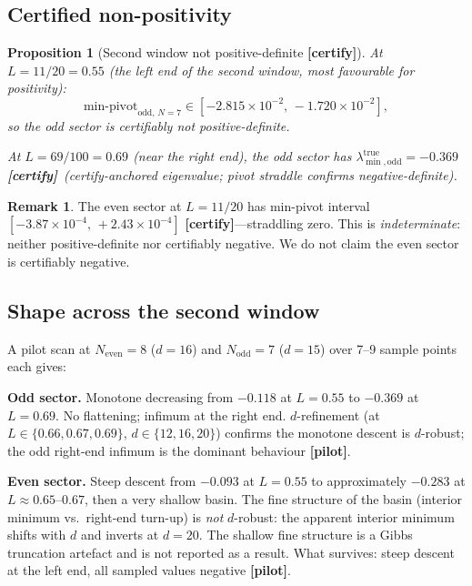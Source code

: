 \documentclass[12pt,a4paper]{amsart}
\theoremstyle{plain}
\newtheorem{proposition}[theorem]{Proposition}
\theoremstyle{definition}
\newtheorem{remark}[theorem]{Remark}
\newcommand{\ltrues}[1]{\lambda_{\min,\mathrm{#1}}^{\mathrm{true}}}
\newcommand{\certify}{\textbf{[certify]}}
\newcommand{\pilot}{\textbf{[pilot]}}
\begin{document}
\subsection{Certified non-positivity}

\begin{proposition}[Second window not positive-definite \certify]
\label{prop:second-negative}
At $L = 11/20 = 0.55$ (the left end of the second window, most favourable
for positivity):
\[
  \text{min-pivot}_{\mathrm{odd},\,N=7} \in [-2.815\times10^{-2},\,-1.720\times10^{-2}],
\]
so the odd sector is certifiably not positive-definite.

At $L = 69/100 = 0.69$ (near the right end), the odd sector has
$\ltrues{odd} = -0.369$ \certify\ (certify-anchored eigenvalue;
pivot straddle confirms negative-definite).
\end{proposition}

\begin{remark}
The even sector at $L=11/20$ has min-pivot interval
$[-3.87\times10^{-4},\, +2.43\times10^{-4}]$ \certify---straddling zero.
This is \emph{indeterminate}: neither positive-definite nor certifiably
negative.  We do not claim the even sector is certifiably negative.
\end{remark}

\subsection{Shape across the second window}

A pilot scan at $N_{\mathrm{even}}=8$ ($d=16$) and $N_{\mathrm{odd}}=7$
($d=15$) over 7--9 sample points each gives:

\textbf{Odd sector.}  Monotone decreasing from $-0.118$ at $L=0.55$ to
$-0.369$ at $L=0.69$.  No flattening; infimum at the right end.
$d$-refinement (at $L \in \{0.66,0.67,0.69\}$, $d \in \{12,16,20\}$)
confirms the monotone descent is $d$-robust; the odd right-end infimum is
the dominant behaviour \pilot.

\textbf{Even sector.}  Steep descent from $-0.093$ at $L=0.55$ to
approximately $-0.283$ at $L \approx 0.65$--$0.67$, then a very shallow
basin.  The fine structure of the basin (interior minimum vs.\ right-end
turn-up) is \emph{not} $d$-robust: the apparent interior minimum shifts with
$d$ and inverts at $d=20$.  The shallow fine structure is a Gibbs truncation
artefact and is not reported as a result.  What survives: steep descent at
the left end, all sampled values negative \pilot.
\end{document}
